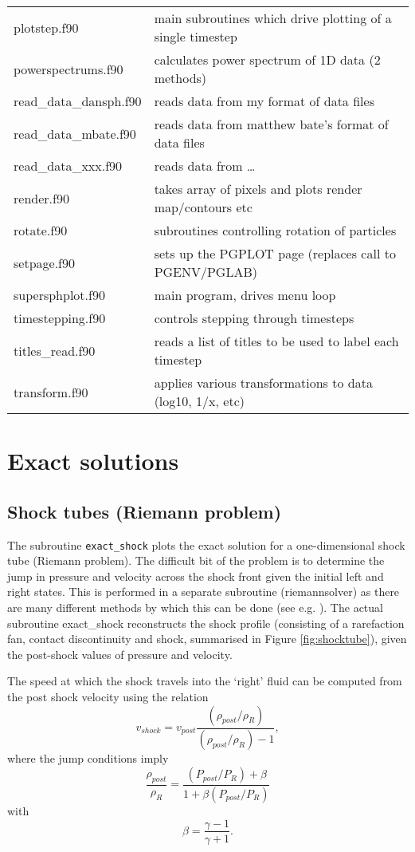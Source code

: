 \documentclass[a4paper,11pt]{article}
\begin{document}
\begin{longtable}{|lp{}|}
     plotstep.f90           & main subroutines which drive plotting of a single timestep\\
     powerspectrums.f90     & calculates power spectrum of 1D data (2 methods)\\
     read\_data\_dansph.f90   & reads data from my format of data files\\
     read\_data\_mbate.f90    & reads data from matthew bate's format of data files\\
     read\_data\_xxx.f90 & reads data from \ldots \\ 
     render.f90	 	 & takes array of pixels and plots render map/contours etc\\
     rotate.f90             & subroutines controlling rotation of particles\\
     setpage.f90            & sets up the PGPLOT page (replaces call to PGENV/PGLAB)\\
     supersphplot.f90	 & main program, drives menu loop\\
     timestepping.f90       & controls stepping through timesteps\\
     titles\_read.f90        & reads a list of titles to be used to label each timestep\\
     transform.f90	 	 & applies various transformations to data (log10, 1/x, etc) \\
\end{longtable}

\section{Exact solutions}
\label{sec:exact}
\subsection{Shock tubes (Riemann problem)}
 The subroutine \verb+exact_shock+ plots the exact solution for a one-dimensional shock tube
(Riemann problem). The difficult bit of the problem is to determine the jump in
pressure and velocity across the shock front given the initial left and right
states. This is performed in a separate subroutine (riemannsolver) as there are 
many different methods by which this can be done (see e.g. \citealt{toro92}). 
The actual subroutine exact\_shock reconstructs the shock profile (consisting of
a rarefaction fan, contact discontinuity and shock, summarised in Figure
\ref{fig:shocktube}), given the post-shock values of pressure and
velocity. 

 The speed at which the shock travels into the `right' fluid can be computed from the post shock
velocity using the relation
\begin{equation}
v_{shock} = v_{post}\frac{(\rho_{post}/\rho_R)}{(\rho_{post}/\rho_R)- 1},
\end{equation}
where the jump conditions imply
\begin{equation}
\frac{\rho_{post}}{\rho_R} = \frac{(P_{post}/P_R) + \beta}{1 + \beta (P_{post}/P_R)}
\end{equation}
with
\begin{equation}
\beta = \frac{\gamma - 1}{\gamma + 1}.
\end{equation}
\end{document}
